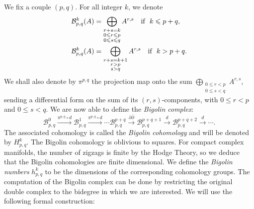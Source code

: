 \documentclass[leqno]{article}
\theoremstyle{definition}
\numberwithin{equation}{section}
\begin{document}
We fix a couple $(p, q)$. For all integer $k$, we denote
\[
\aligned
\mathcal{B}^k_{p, q}(A)
&=
\bigoplus_{
\substack{
r+s=k \\
0 \leqslant r \leqslant p \\
0 \leqslant s \leqslant q}
}
A^{r, s}
\quad
\text{if}
\ \ 
k \leqslant p+q, \\
\mathcal{B}^k_{p, q}(A)
&=
\bigoplus_{
\substack{
r+s=k+1 \\
r > p \\
s > q}
}
A^{r, s}
\quad
\text{if}
\ \ 
k > p+q. \\
\endaligned
\]
We shall also denote by $\pi^{p, q}$ the projection map onto the sum 
$\bigoplus_
{\substack{
0 \leqslant r < p\\
0 \leqslant s < q}}
A^{r, s}$,
sending a differential form on the sum of its $(r, s)$-components, with $0 \leqslant r < p$ and $0 \leqslant s < q$. We are now able to define the {\sl Bigolin complex}:
\[
\mathcal{B}_{p, q}^0
\xrightarrow{\pi^{p, q} \circ d}
\mathcal{B}_{p, q}^1
\xrightarrow{\pi^{p, q} \circ d}
\cdots
\mathcal{B}_{p, q}^{p+q}
\xrightarrow{\partial \overline{\partial}}
\mathcal{B}_{p, q}^{p+q+1}
\xrightarrow{d}
\mathcal{B}_{p, q}^{p+q+2}
\xrightarrow{d}
\cdots.
\]
The associated cohomology is called the {\sl Bigolin cohomology} and will be denoted by $H^k_{p, q}$. The Bigolin cohomology is oblivious to squares. For compact complex manifolds, the number of zigzags is finite by the Hodge Theory, so we deduce that the Bigolin cohomologies are finite dimensional.
We define the {\sl Bigolin numbers} $h^k_{p, q}$ to be the dimensions of the corresponding cohomology groups. The computation of the Bigolin complex can be done by restricting the original double complex to the bidegree in which we are interested. We will use the following formal construction:
\end{document}
